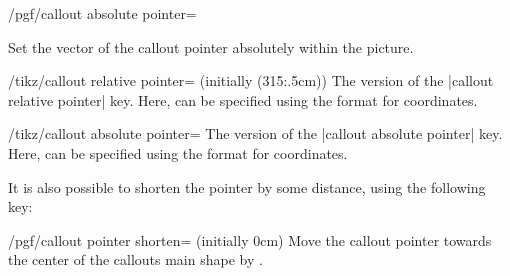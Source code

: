 \begin{key}{/pgf/callout absolute pointer=}
  
  Set the vector of the callout pointer absolutely within the picture.
  
\end{key}



\begin{key}{/tikz/callout relative pointer= (initially {(315:.5cm)})}
	The \tikzname{} version of the |callout relative pointer| key. Here,
	 can be specified using the \tikzname{} format for
	coordinates.
\end{key}

\begin{key}{/tikz/callout absolute pointer=}
	The \tikzname{} version of the |callout absolute pointer| key. Here,
	 can be specified using the \tikzname{} format for
	coordinates.
\end{key}

	It is also possible to shorten the pointer by some distance, using 
	the following key:
	
\begin{key}{/pgf/callout pointer shorten= (initially 0cm)}
	Move the callout pointer towards the center of the callouts main 
	shape by . 
	
\begin{codeexample}[]
\end{codeexample}
\end{key}
	
